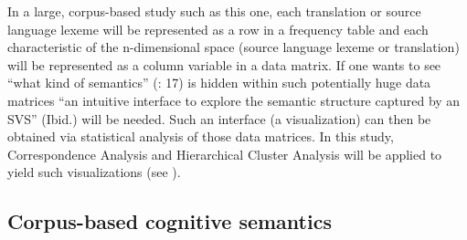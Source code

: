 In a large, corpus-based study such as this one, each translation or source language lexeme will be represented as a row in a frequency table and each characteristic of the n-dimensional space (source language lexeme or translation) will be represented as a column variable in a data matrix. If one wants to see “what kind of semantics” (\citealt{heylen_looking_2012}: 17) is hidden within such potentially huge data matrices “an intuitive interface to explore the semantic structure captured by an SVS” (Ibid.) will be needed. Such an interface (a visualization) can then be obtained via statistical analysis of those data matrices. In this study, Correspondence Analysis and Hierarchical Cluster Analysis will be applied to yield such visualizations (see ).


\subsection{\label{sec:2.4.3}  Corpus-based cognitive semantics}


